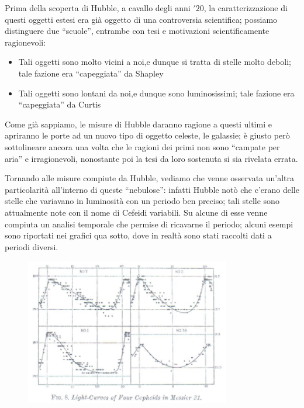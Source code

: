 Prima della scoperta di Hubble, a cavallo degli anni $'20$, la caratterizzazione di questi oggetti estesi era già oggetto di una controversia scientifica; possiamo distinguere due ``scuole'', entrambe con tesi e motivazioni scientificamente ragionevoli:
\begin{itemize}
\item Tali oggetti sono molto vicini a noi,e dunque si tratta di stelle molto deboli; tale fazione era ``capeggiata'' da Shapley
\item Tali oggetti sono lontani da noi,e dunque sono luminosissimi; tale fazione era ``capeggiata'' da Curtis
\end{itemize}
Come già sappiamo, le misure di Hubble daranno ragione a questi ultimi e apriranno le porte ad un nuovo tipo di oggetto celeste, le galassie; è giusto però sottolineare ancora una volta che le ragioni dei primi non sono ``campate per aria'' e irragionevoli, nonostante poi la tesi da loro sostenuta si sia rivelata errata.

Tornando alle misure compiute da Hubble, vediamo che venne osservata un'altra particolarità all'interno di queste ``nebulose'': infatti Hubble notò che c'erano delle stelle che variavano in luminosità con un periodo ben preciso; tali stelle sono attualmente note con il nome di Cefeidi variabili. Su alcune di esse venne compiuta un analisi temporale che permise di ricavarne il periodo; alcuni esempi sono riportati nei grafici qua sotto, dove in realtà sono stati raccolti dati a periodi diversi.

\begin{figure}[!h]
\centering
\includegraphics[width=0.8\textwidth]{Img/bertin_18.png}
\end{figure}


